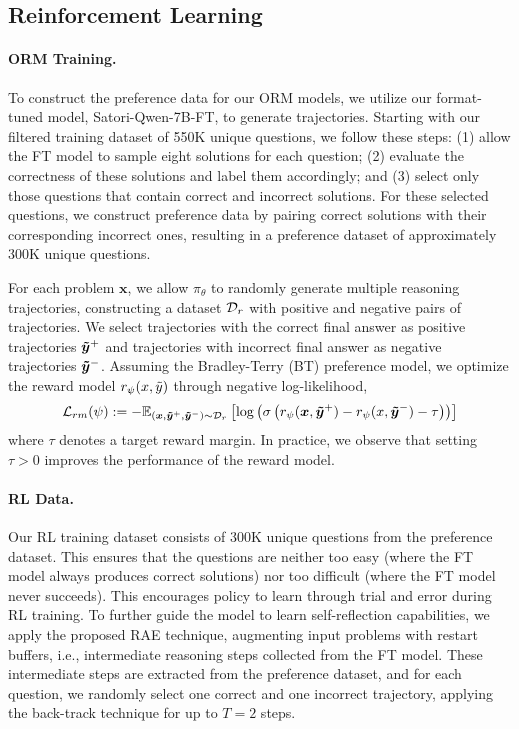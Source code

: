 \subsection{Reinforcement Learning}
\label{subsec:rl_details}

\paragraph{ORM Training.}
To construct the preference data for our ORM models, we utilize our format-tuned model, Satori-Qwen-7B-FT, to generate trajectories. Starting with our filtered training dataset of 550K unique questions, we follow these steps: (1) allow the FT model to sample eight solutions for each question; (2) evaluate the correctness of these solutions and label them accordingly; and (3) select only those questions that contain correct and incorrect solutions. For these selected questions, we construct preference data by pairing correct solutions with their corresponding incorrect ones, resulting in a preference dataset of approximately 300K unique questions.

For each problem $\boldsymbol{x}$, we allow $\pi_{\theta}$ to randomly generate multiple reasoning trajectories, constructing a dataset $\mathcal{D}_r$ with positive and negative pairs of trajectories. We select trajectories with the correct final answer as positive trajectories $\boldsymbol{\Tilde{y}}^{+}$ and trajectories with incorrect final answer as negative trajectories $\boldsymbol{\Tilde{y}}^{-}$. Assuming the Bradley-Terry (BT) preference model, we optimize the reward model $r_\psi(x, \Tilde{y})$ through negative log-likelihood,
    \begin{align}
    \mathcal{L}_{rm}(\psi) \mathrel{\mathop{:}}= -\mathbb{E}_{(\boldsymbol{x}, \boldsymbol{\Tilde{y}}^{+}, \boldsymbol{\Tilde{y}}^{-}) \sim \mathcal{D}_r} \left[ \log \left( \sigma \left( r_\psi(\boldsymbol{x}, \boldsymbol{\Tilde{y}}^{+}) - r_\psi(x, \boldsymbol{\Tilde{y}}^{-}) -\tau \right) \right) \nonumber \right]
    \end{align}
where $\tau$ denotes a target reward margin. In practice, we observe that setting $\tau>0$ improves the performance of the reward model.

\paragraph{RL Data.}
Our RL training dataset consists of 300K unique questions from the preference dataset. This ensures that the questions are neither too easy (where the FT model always produces correct solutions) nor too difficult (where the FT model never succeeds). This encourages policy to learn through trial and error during RL training. To further guide the model to learn self-reflection capabilities, we apply the proposed RAE technique, augmenting input problems with restart buffers, i.e., intermediate reasoning steps collected from the FT model. These intermediate steps are extracted from the preference dataset, and for each question, we randomly select one correct and one incorrect trajectory, applying the back-track technique for up to $T=2$ steps.

